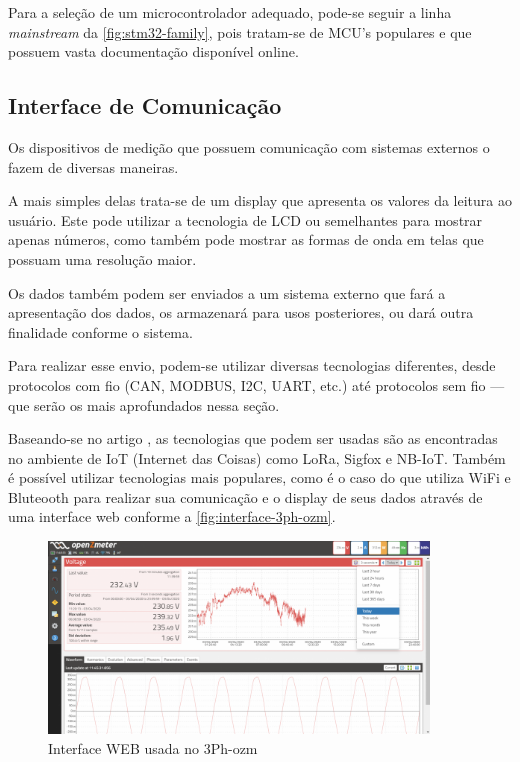 Para a seleção de um microcontrolador adequado, pode-se seguir a linha \textit{mainstream} da \autoref{fig:stm32-family}, pois tratam-se de \gls{MCU}'s populares e que possuem vasta documentação disponível online.

\subsection{Interface de Comunicação}\label{sec:Interface}

Os dispositivos de medição que possuem comunicação com sistemas externos o fazem de diversas maneiras. 

A mais simples delas trata-se de um display que apresenta os valores da leitura ao usuário. Este pode utilizar a tecnologia de \gls{LCD} ou semelhantes para mostrar apenas números, como também pode mostrar as formas de onda em telas que possuam uma resolução maior.

Os dados também podem ser enviados a um sistema externo que fará a apresentação dos dados, os armazenará para usos posteriores, ou dará outra finalidade conforme o sistema.

Para realizar esse envio, podem-se utilizar diversas tecnologias diferentes, desde protocolos com fio (CAN, MODBUS, I2C, UART, etc.) até protocolos sem fio --- que serão os mais aprofundados nessa seção.

Baseando-se no artigo \citet{lowcost-smartmeter}, as tecnologias que podem ser usadas são as encontradas no ambiente de IoT (Internet das Coisas) como LoRa, Sigfox e NB-IoT. Também é possível utilizar tecnologias mais populares, como é o caso do \citet{3ph-ozm} que utiliza WiFi e Bluteooth para realizar sua comunicação e o display de seus dados através de uma interface web conforme a \autoref{fig:interface-3ph-ozm}.

\begin{figure}[htb]
    \caption{Interface WEB usada no 3Ph-ozm}
    \label{fig:interface-3ph-ozm}
    \includegraphics[width=0.9\textwidth]{figuras/interface-web-openzmeter.png}
\end{figure}

